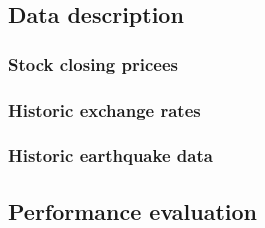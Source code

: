 \documentclass{article}
\begin{document}
\subsection{Data description}

\subsubsection{Stock closing pricees}
\subsubsection{Historic exchange rates}
\subsubsection{Historic earthquake data}


\subsection{Performance evaluation}
\end{document}
